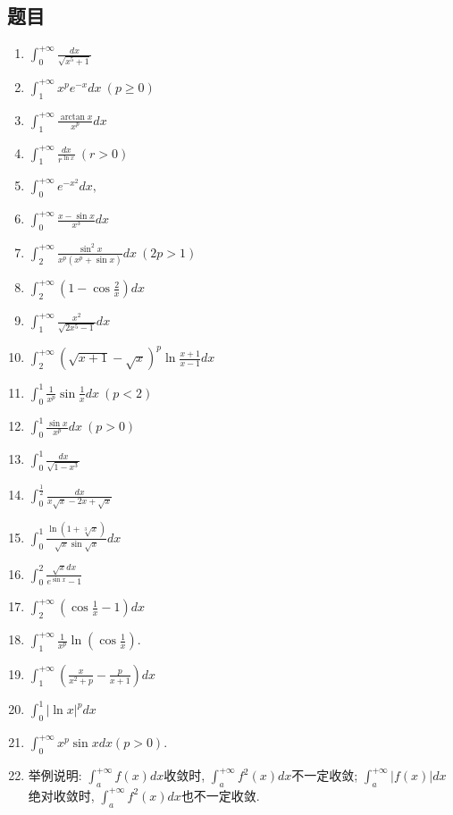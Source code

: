 \documentclass[UTF8,11pt, a4paper, oneside, fontset=none]{ctexbook}
\begin{document}
\subsection*{题目}
\begin{enumerate}
\item $\int_{0}^{+\infty} \frac{dx}{\sqrt{x^5 + 1}}$ 
\item $ \int_{1}^{+\infty} x^p e^{-x}dx\ (p \geq 0)$
\item $ \int_{1}^{+\infty} \frac{\arctan x}{x^p}dx$
\item $\int_{1}^{+\infty} \frac{dx}{r^{\ln x}}\ (r > 0)$
\item $\int_{0}^{+\infty} e^{-x^2}dx,$
\item $\int_{0}^{+\infty} \frac{x - \sin x}{x^3}dx$ 
\item $\int_{2}^{+\infty} \frac{\sin^2 x}{x^p(x^p + \sin x)}dx\ (2p > 1)$ 
\item $ \int_{2}^{+\infty} \left(1 - \cos \frac{2}{x}\right) dx$
\item $\int_{1}^{+\infty} \frac{x^2}{\sqrt{2x^5 - 1}}dx$ 
\item $ \int_{2}^{+\infty} (\sqrt{x+1} - \sqrt{x})^p \ln \frac{x+1}{x-1}dx$
\item $\int_{0}^{1} \frac{1}{x^p} \sin \frac{1}{x}dx\ (p < 2)$
\item $\int_{0}^{1} \frac{\sin x}{x^p}dx\ (p > 0)$
\item $\int_{0}^{1} \frac{dx}{\sqrt{1 - x^3}}$ 
\item  $\int_{0}^{\frac{1}{2}} \frac{dx}{x\sqrt{x} - 2x + \sqrt{x}}$
\item $\int_{0}^{1} \frac{\ln(1 + \sqrt[3]{x})}{\sqrt{x} \sin \sqrt{x}}dx$
\item $\int_{0}^{2} \frac{\sqrt{x}dx}{e^{\sin x} - 1}$
\item $\int_{2}^{+\infty} \left( \cos \frac{1}{x} - 1 \right) dx$
\item $\int_1^{+\infty} \frac{1}{x^p} \ln \left( \cos \frac{1}{x} \right)$.
\item $\int_1^{+\infty} \left( \frac{x}{x^2 + p} - \frac{p}{x+1} \right)dx$
\item $\int_0^1 |\ln x|^p dx$

\item $\int_0^{+\infty} x^p \sin x dx (p > 0)$.

\item 举例说明: $\int_a^{+\infty} f(x) dx$收敛时, $\int_a^{+\infty} f^2(x) dx$不一定收敛; $\int_a^{+\infty} |f(x)| dx$绝对收敛时, $\int_a^{+\infty} f^2(x) dx$也不一定收敛.
\end{enumerate}
\clearpage
\end{document}
